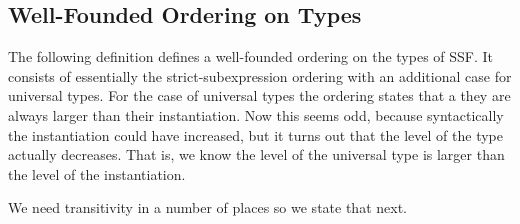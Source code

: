 \subsection{Well-Founded Ordering on Types}
\label{subsec:well-founded_ordering_on_types_ssf}
The following definition defines a well-founded ordering on the types
of SSF.  It consists of essentially the strict-subexpression ordering
with an additional case for universal types.  For the case of
universal types the ordering states that a they are always larger than
their instantiation.  Now this seems odd, because syntactically the
instantiation could have increased, but it turns out that the level of
the type actually decreases.  That is, we know the level of the
universal type is larger than the level of the instantiation.

\noindent
We need transitivity in a number of places so we state that next.

